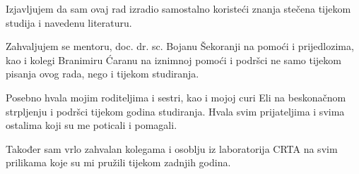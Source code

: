 \documentclass[12pt,a4paper]{report}
\begin{document}
\clearemptypage{}
\vspace*{\fill}
\noindent Izjavljujem da sam ovaj rad izradio samostalno koristeći znanja stečena
tijekom studija i navedenu literaturu.

\vspace{8mm}
\quad Zahvaljujem se mentoru, doc. dr. sc. Bojanu Šekoranji na pomoći i prijedlozima,
kao i kolegi Branimiru Ćaranu na iznimnoj pomoći i podršci ne samo tijekom pisanja ovog
rada, nego i tijekom studiranja.

\quad Posebno hvala mojim roditeljima i sestri, kao i mojoj curi Eli na beskonačnom strpljenju
i podršci tijekom godina studiranja. Hvala svim prijateljima i svima ostalima
koji su me poticali i pomagali.

\quad Također sam vrlo zahvalan kolegama i osoblju iz laboratorija CRTA na svim prilikama
koje su mi pružili tijekom zadnjih godina.

\vspace{10mm}
\begin{flushright}
    \autorime{}
\end{flushright}
\vspace*{\fill}
\clearpage



\setcounter{page}{1}
\pagestyle{fancy}
\hypersetup{pageanchor=true}

\tableofcontents
\clearpage

\listoffigures
\clearpage

\listoftables
\clearpage





\end{document}
